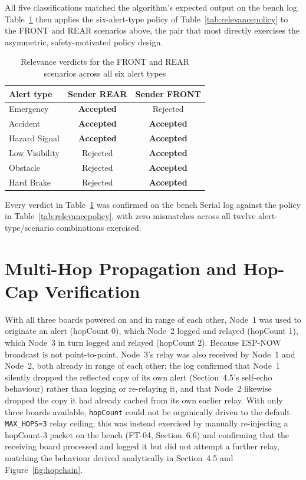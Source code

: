 \documentclass[12pt,a4paper]{report}
\begin{document}
All five classifications matched the algorithm's expected output on the bench log. Table~\ref{tab:relevanceoutcomes} then applies the six-alert-type policy of Table~\ref{tab:relevancepolicy} to the FRONT and REAR scenarios above, the pair that most directly exercises the asymmetric, safety-motivated policy design.

\begin{table}[H]
\centering
\caption{Relevance verdicts for the FRONT and REAR scenarios across all six alert types}
\label{tab:relevanceoutcomes}
\begin{tabular}{@{}lcc@{}}
\toprule
\textbf{Alert type} & \textbf{Sender REAR} & \textbf{Sender FRONT} \\
\midrule
Emergency & \textbf{Accepted} & Rejected \\
Accident & \textbf{Accepted} & \textbf{Accepted} \\
Hazard Signal & \textbf{Accepted} & \textbf{Accepted} \\
Low Visibility & Rejected & \textbf{Accepted} \\
Obstacle & Rejected & \textbf{Accepted} \\
Hard Brake & Rejected & \textbf{Accepted} \\
\bottomrule
\end{tabular}
\end{table}

Every verdict in Table~\ref{tab:relevanceoutcomes} was confirmed on the bench Serial log against the policy in Table~\ref{tab:relevancepolicy}, with zero mismatches across all twelve alert-type/scenario combinations exercised.

\section{Multi-Hop Propagation and Hop-Cap Verification}
With all three boards powered on and in range of each other, Node~1 was used to originate an alert (hopCount 0), which Node~2 logged and relayed (hopCount 1), which Node~3 in turn logged and relayed (hopCount 2). Because ESP-NOW broadcast is not point-to-point, Node~3's relay was also received by Node~1 and Node~2, both already in range of each other; the log confirmed that Node~1 silently dropped the reflected copy of its own alert (Section~4.5's self-echo behaviour) rather than logging or re-relaying it, and that Node~2 likewise dropped the copy it had already cached from its own earlier relay. With only three boards available, \texttt{hopCount} could not be organically driven to the default \texttt{MAX\_HOPS=3} relay ceiling; this was instead exercised by manually re-injecting a hopCount-3 packet on the bench (FT-04, Section~6.6) and confirming that the receiving board processed and logged it but did not attempt a further relay, matching the behaviour derived analytically in Section~4.5 and Figure~\ref{fig:hopchain}.
\end{document}
